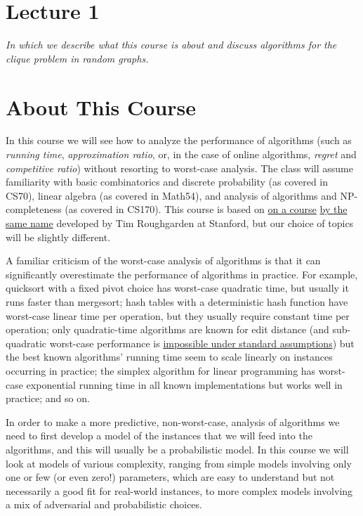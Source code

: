 




\iftex {} \fi

\iftex \section*{Lecture 1} \fi

{\em In which we describe what this course is about and discuss algorithms for the clique problem in random graphs.}

\iftex \bigskip \fi

\section{About This Course}

In this course we will see how to analyze the performance of algorithms (such as {\em running time}, {\em approximation ratio}, or, in the case of online algorithms, {\em regret} and  {\em competitive ratio}) without resorting to worst-case analysis. The class will assume familiarity with basic combinatorics and discrete probability  (as covered in CS70), linear algebra (as covered in Math54), and analysis of algorithms and NP-completeness (as covered in CS170). This course is based on \href{http://theory.stanford.edu/~tim/f14/f14.html}{on a course} \href{http://theory.stanford.edu/~tim/w17/w17.html}{by the same name} developed by Tim Roughgarden at Stanford, but our choice of topics will be slightly different.

A familiar criticism of the worst-case analysis of algorithms is that it can significantly overestimate the performance of algorithms in practice. For example, quicksort with a fixed pivot choice has worst-case quadratic time, but usually it runs faster than mergesort; hash tables with a deterministic hash function have worst-case linear time per operation, but they usually require constant time per operation; only quadratic-time algorithms are known for edit distance (and sub-quadratic worst-case performance is \href{https://arxiv.org/abs/1412.0348}{impossible under standard assumptions}) but the best known algorithms' running time seem to scale linearly on instances occurring  in practice; the simplex algorithm for linear programming has worst-case exponential running time in all known implementations but works well in practice; and so on.

In order to make a more predictive, non-worst-case, analysis of algorithms we need to first develop a model of the instances that we will feed into the algorithms, and this will usually be a probabilistic model. In this course we will look at models of various complexity, ranging from simple models involving only one or few (or even zero!) parameters, which are easy to understand but not necessarily a good fit for real-world instances, to more complex models involving a mix of adversarial and probabilistic choices. 


